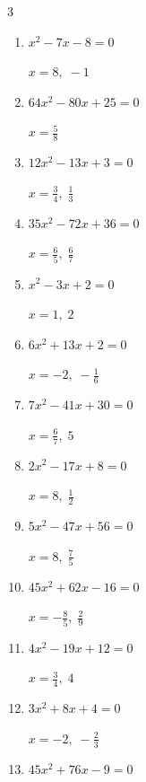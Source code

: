 \begin{multicols}{3}
\begin{enumerate}
        $\displaystyle x=\frac{5}{4},\; -\frac{1}{2}$

  \item $x^{2}-7x-8=0$

        $\displaystyle x=8,\; -1$

  \item $64x^{2}-80x+25=0$

        $\displaystyle x=\frac{5}{8}$

  \item $12x^{2}-13x+3=0$

        $\displaystyle x=\frac{3}{4},\; \frac{1}{3}$

  \item $35x^{2}-72x+36=0$

        $\displaystyle x=\frac{6}{5},\; \frac{6}{7}$

  \item $x^{2}-3x+2=0$

        $\displaystyle x=1,\; 2$

  \item $6x^{2}+13x+2=0$

        $\displaystyle x=-2,\; -\frac{1}{6}$

  \item $7x^{2}-41x+30=0$

        $\displaystyle x=\frac{6}{7},\; 5$

  \item $2x^{2}-17x+8=0$

        $\displaystyle x=8,\; \frac{1}{2}$

\columnbreak %

\resetques

  \item $5x^{2}-47x+56=0$

        $\displaystyle x=8,\; \frac{7}{5}$

  \item $45x^{2}+62x-16=0$

        $\displaystyle x=-\frac{8}{5},\; \frac{2}{9}$

  \item $4x^{2}-19x+12=0$

        $\displaystyle x=\frac{3}{4},\; 4$

  \item $3x^{2}+8x+4=0$

        $\displaystyle x=-2,\; -\frac{2}{3}$

  \item $45x^{2}+76x-9=0$


\end{enumerate}
\end{multicols}
